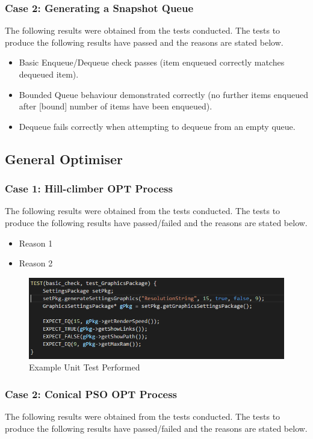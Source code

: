 \documentclass[11pt]{article}
\begin{document}
\subsubsection{Case 2: Generating a Snapshot Queue}
The following results were obtained from the tests conducted. The tests to produce the
following results have passed and the reasons are stated below.

\begin{itemize}
	\item Basic Enqueue/Dequeue check passes (item enqueued correctly matches dequeued item).
	\item Bounded Queue behaviour demonstrated correctly (no further items enqueued after [bound] number of items have been enqueued).
	\item Dequeue fails correctly when attempting to dequeue from an empty queue.
\end{itemize}

\subsection{General Optimiser}
\subsubsection{Case 1: Hill-climber OPT Process}
The following results were obtained from the tests conducted. The tests to produce the
following results have passed/failed and the reasons are stated below.

\begin{itemize}
	\item Reason 1
	\item Reason 2
\end{itemize}

\begin{figure}
\includegraphics[scale=0.5]{GTest.png}
\caption{Example Unit Test Performed}
\end{figure}

\subsubsection{Case 2: Conical PSO OPT Process}
The following results were obtained from the tests conducted. The tests to produce the
following results have passed/failed and the reasons are stated below.
\end{document}
